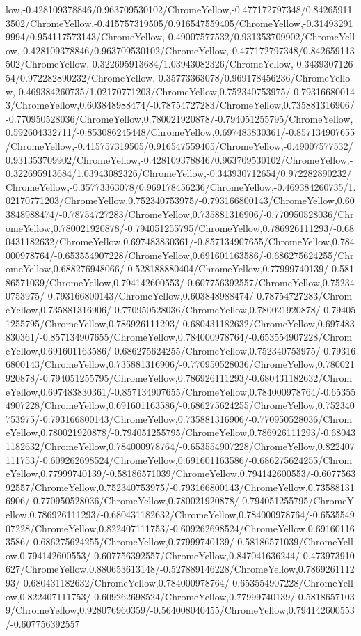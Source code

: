 {\begin{tikzternal}
{low,-0.428109378846/0.963709530102/ChromeYellow,-0.477172797348/0.842659113502/ChromeYellow,-0.415757319505/0.916547559405/ChromeYellow,-0.314932919994/0.954117573143/ChromeYellow,-0.49007577532/0.931353709902/ChromeYellow,-0.428109378846/0.963709530102/ChromeYellow,-0.477172797348/0.842659113502/ChromeYellow,-0.322695913684/1.03943082326/ChromeYellow,-0.343930712654/0.972282890232/ChromeYellow,-0.35773363078/0.969178456236/ChromeYellow,-0.469384260735/1.02170771203/ChromeYellow,0.752340753975/-0.793166800143/ChromeYellow,0.603848988474/-0.78754727283/ChromeYellow,0.735881316906/-0.770950528036/ChromeYellow,0.780021920878/-0.794051255795/ChromeYellow,0.592604332711/-0.853086245448/ChromeYellow,0.697483830361/-0.857134907655/ChromeYellow,-0.415757319505/0.916547559405/ChromeYellow,-0.49007577532/0.931353709902/ChromeYellow,-0.428109378846/0.963709530102/ChromeYellow,-0.322695913684/1.03943082326/ChromeYellow,-0.343930712654/0.972282890232/ChromeYellow,-0.35773363078/0.969178456236/ChromeYellow,-0.469384260735/1.02170771203/ChromeYellow,0.752340753975/-0.793166800143/ChromeYellow,0.603848988474/-0.78754727283/ChromeYellow,0.735881316906/-0.770950528036/ChromeYellow,0.780021920878/-0.794051255795/ChromeYellow,0.786926111293/-0.680431182632/ChromeYellow,0.697483830361/-0.857134907655/ChromeYellow,0.784000978764/-0.653554907228/ChromeYellow,0.691601163586/-0.686275624255/ChromeYellow,0.688276948066/-0.528188880404/ChromeYellow,0.77999740139/-0.58186571039/ChromeYellow,0.794142600553/-0.607756392557/ChromeYellow,0.752340753975/-0.793166800143/ChromeYellow,0.603848988474/-0.78754727283/ChromeYellow,0.735881316906/-0.770950528036/ChromeYellow,0.780021920878/-0.794051255795/ChromeYellow,0.786926111293/-0.680431182632/ChromeYellow,0.697483830361/-0.857134907655/ChromeYellow,0.784000978764/-0.653554907228/ChromeYellow,0.691601163586/-0.686275624255/ChromeYellow,0.752340753975/-0.793166800143/ChromeYellow,0.735881316906/-0.770950528036/ChromeYellow,0.780021920878/-0.794051255795/ChromeYellow,0.786926111293/-0.680431182632/ChromeYellow,0.697483830361/-0.857134907655/ChromeYellow,0.784000978764/-0.653554907228/ChromeYellow,0.691601163586/-0.686275624255/ChromeYellow,0.752340753975/-0.793166800143/ChromeYellow,0.735881316906/-0.770950528036/ChromeYellow,0.780021920878/-0.794051255795/ChromeYellow,0.786926111293/-0.680431182632/ChromeYellow,0.784000978764/-0.653554907228/ChromeYellow,0.822407111753/-0.609262698524/ChromeYellow,0.691601163586/-0.686275624255/ChromeYellow,0.77999740139/-0.58186571039/ChromeYellow,0.794142600553/-0.607756392557/ChromeYellow,0.752340753975/-0.793166800143/ChromeYellow,0.735881316906/-0.770950528036/ChromeYellow,0.780021920878/-0.794051255795/ChromeYellow,0.786926111293/-0.680431182632/ChromeYellow,0.784000978764/-0.653554907228/ChromeYellow,0.822407111753/-0.609262698524/ChromeYellow,0.691601163586/-0.686275624255/ChromeYellow,0.77999740139/-0.58186571039/ChromeYellow,0.794142600553/-0.607756392557/ChromeYellow,0.847041636244/-0.473973910627/ChromeYellow,0.880653613148/-0.527889146228/ChromeYellow,0.786926111293/-0.680431182632/ChromeYellow,0.784000978764/-0.653554907228/ChromeYellow,0.822407111753/-0.609262698524/ChromeYellow,0.77999740139/-0.58186571039/ChromeYellow,0.928076960359/-0.564008040455/ChromeYellow,0.794142600553/-0.607756392557}
\end{tikzternal}}
